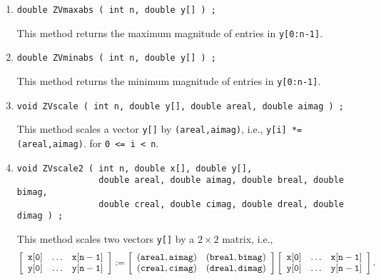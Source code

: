 \begin{enumerate}
\begin{verbatim}
\end{verbatim}
{\tt y[i] = x[index[i]]} for {\tt 0 <= i < n}.
\item
\begin{verbatim}
double ZVmaxabs ( int n, double y[] ) ;
\end{verbatim}
This method returns the maximum magnitude of entries in {\tt y[0:n-1]}.
\item
\begin{verbatim}
double ZVminabs ( int n, double y[] ) ;
\end{verbatim}
This method returns the minimum magnitude of entries in {\tt y[0:n-1]}.
\item
\begin{verbatim}
void ZVscale ( int n, double y[], double areal, double aimag ) ;
\end{verbatim}
This method scales a vector {\tt y[]} by {\tt (areal,aimag)},
i.e.,
{\tt y[i] *= (areal,aimag)}.
for {\tt 0 <= i < n}.
\item
\begin{verbatim}
void ZVscale2 ( int n, double x[], double y[], 
                double areal, double aimag, double breal, double bimag, 
                double creal, double cimag, double dreal, double dimag ) ;
\end{verbatim}
This method scales two vectors {\tt y[]} by a $2 \times 2$ matrix,
i.e.,
$$
\left \lbrack \begin{array}{ccc}
{\tt x[0]} & \ldots & {\tt x[n-1]} \\
{\tt y[0]} & \ldots & {\tt y[n-1]} 
\end{array} \right \rbrack
:= 
\left \lbrack \begin{array}{cc}
{\tt (areal,aimag)} & {\tt (breal,bimag)} \\
{\tt (creal,cimag)} & {\tt (dreal,dimag)}
\end{array} \right \rbrack
\left \lbrack \begin{array}{ccc}
{\tt x[0]} & \ldots & {\tt x[n-1]} \\
{\tt y[0]} & \ldots & {\tt y[n-1]} 
\end{array} \right \rbrack.
$$
\end{enumerate}
